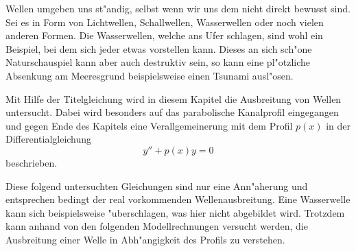 Wellen umgeben uns st"andig, selbst wenn wir uns dem nicht direkt bewusst sind. 
Sei es in Form von Lichtwellen, Schallwellen, Wasserwellen oder noch vielen 
anderen Formen. Die Wasserwellen, welche ans Ufer schlagen, sind wohl ein 
Beispiel, bei dem sich jeder etwas vorstellen kann. Dieses an sich sch"one 
Naturschauspiel kann aber auch destruktiv sein, so kann eine pl"otzliche 
Absenkung am Meeresgrund beispielsweise einen Tsunami ausl"osen.

Mit Hilfe der Titelgleichung wird in diesem Kapitel die Ausbreitung von Wellen 
untersucht. Dabei wird besonders auf das parabolische Kanalprofil eingegangen 
und gegen Ende des Kapitels eine Verallgemeinerung mit dem Profil $p(x)$ in der 
Differentialgleichung
\begin{equation}
	y'' + p(x) y = 0
	\label{eq:wellen:pxdgl}
\end{equation}
beschrieben.

Diese folgend untersuchten Gleichungen sind nur eine Ann"aherung und 
entsprechen bedingt der real vorkommenden Wellenausbreitung. Eine Wasserwelle 
kann sich beispielsweise "uberschlagen, was hier nicht abgebildet wird. 
Trotzdem kann anhand von den folgenden Modellrechnungen versucht werden, die 
Ausbreitung einer Welle in Abh"angigkeit des Profils zu verstehen.
